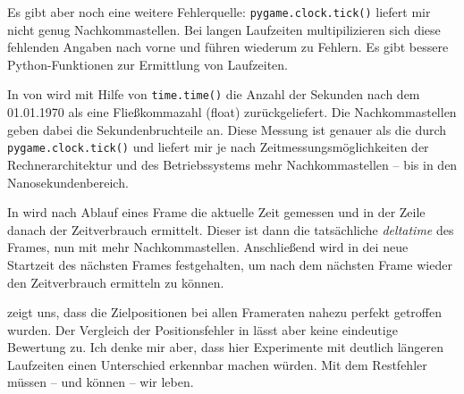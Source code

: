 
Es gibt aber noch eine weitere Fehlerquelle: \texttt{pygame.clock.tick()} liefert mir nicht genug Nachkommastellen. Bei langen Laufzeiten multipilizieren sich diese fehlenden Angaben nach vorne und führen wiederum zu Fehlern. Es gibt bessere Python-Funktionen zur Ermittlung von Laufzeiten.

In  von  wird mit Hilfe von \texttt{time.time()} die Anzahl der Sekunden nach dem 01.01.1970 als eine Fließkommazahl (float) zurückgeliefert. Die Nachkommastellen geben dabei die Sekundenbruchteile an. Diese Messung ist genauer als die durch \texttt{pygame.clock.tick()} und liefert mir je nach Zeitmessungsmöglichkeiten der Rechnerarchitektur und des Betriebssystems mehr Nachkommastellen -- bis in den Nanosekundenbereich.

In  wird nach Ablauf eines Frame die aktuelle Zeit gemessen und in der Zeile danach der Zeitverbrauch ermittelt. Dieser ist dann die tatsächliche \emph{deltatime} des Frames, nun mit mehr Nachkommastellen. Anschließend wird in  dei neue Startzeit des nächsten Frames festgehalten, um nach dem nächsten Frame wieder den Zeitverbrauch ermitteln zu können.

 zeigt uns, dass die Zielpositionen bei allen Frameraten nahezu perfekt getroffen wurden. Der Vergleich der Positionsfehler in  lässt aber keine eindeutige Bewertung zu. Ich denke mir aber, dass hier Experimente mit deutlich längeren Laufzeiten einen Unterschied erkennbar machen würden. Mit dem Restfehler müssen -- und können -- wir leben.



